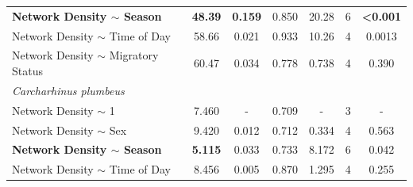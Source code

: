 \documentclass[11pt,a4paper]{article}
\begin{document}
\begin{table}[h!]
\begin{tabular}{@{}lcccccc@{}}
			\textbf{Network Density $\sim$ Season}           & \textbf{48.39}        & \textbf{0.159}        & 0.850        & 20.28         & 6           & \textbf{\textless 0.001} \\
			Network Density $\sim$ Time of Day      & 58.66        & 0.021        & 0.933        & 10.26         & 4           & 0.0013          \\
			Network Density $\sim$ Migratory Status & 60.47        & 0.034        & 0.778        & 0.738         & 4           & 0.390           \\ \midrule
			\textit{Carcharhinus plumbeus}         &              &              &              &               &             &                 \\
			Network Density $\sim$ 1 & 7.460 & -  & 0.709 & - & 3 & - \\
			Network Density $\sim$ Sex              & 9.420        & 0.012        & 0.712        & 0.334         & 4           & 0.563           \\
			\textbf{Network Density $\sim$ Season}           & \textbf{5.115}        & 0.033        & 0.733        & 8.172         & 6           & 0.042           \\
			Network Density $\sim$ Time of Day      & 8.456        & 0.005        & 0.870        & 1.295         & 4           & 0.255           \\ \bottomrule
		\end{tabular}
		\label{network_outputs}
	\end{table}
	
	\newpage
	
\end{document}
